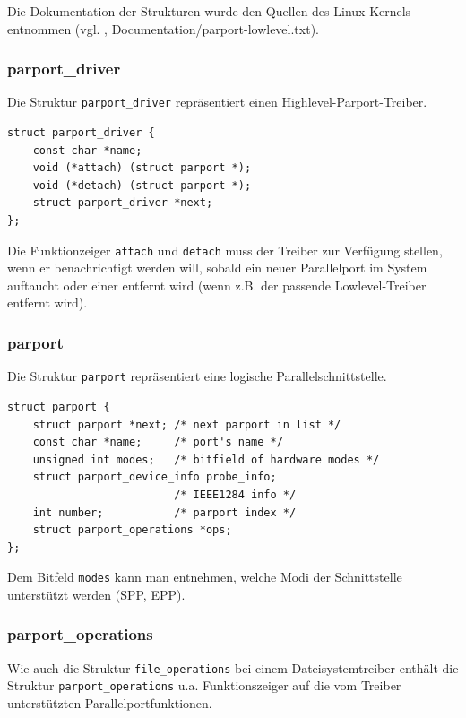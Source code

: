 \documentclass[a4paper,11pt]{article}
\begin{document}
Die Dokumentation der Strukturen wurde den Quellen des Linux-Kernels entnommen 
(vgl. \cite{net:2}, Documentation/parport-lowlevel.txt).

\subsubsection{parport\_driver}

Die Struktur \verb|parport_driver| repräsentiert einen Highlevel-Parport-Treiber.

\begin{verbatim}
struct parport_driver {
    const char *name;
    void (*attach) (struct parport *);
    void (*detach) (struct parport *);
    struct parport_driver *next;
};\end{verbatim}

Die Funktionzeiger \verb|attach| und \verb|detach| muss der Treiber zur Verfügung stellen, wenn er benachrichtigt
werden will, sobald ein neuer Parallelport im System auftaucht oder einer entfernt wird (wenn z.B. der
passende Lowlevel-Treiber entfernt wird).

\subsubsection{parport}

Die Struktur \verb|parport| repräsentiert eine logische Parallelschnittstelle.

\begin{verbatim}
struct parport {
    struct parport *next; /* next parport in list */
    const char *name;     /* port's name */
    unsigned int modes;   /* bitfield of hardware modes */
    struct parport_device_info probe_info;
                          /* IEEE1284 info */
    int number;           /* parport index */
    struct parport_operations *ops;
};\end{verbatim}

Dem Bitfeld \verb|modes| kann man entnehmen, welche Modi der Schnittstelle unterstützt werden (SPP, EPP).

\subsubsection{parport\_operations}

Wie auch die Struktur \verb|file_operations| bei einem Dateisystemtreiber enthält die 
Struktur \verb|parport_operations| u.a. Funktionszeiger auf die vom Treiber unterstützten
Parallelportfunktionen.
\end{document}
